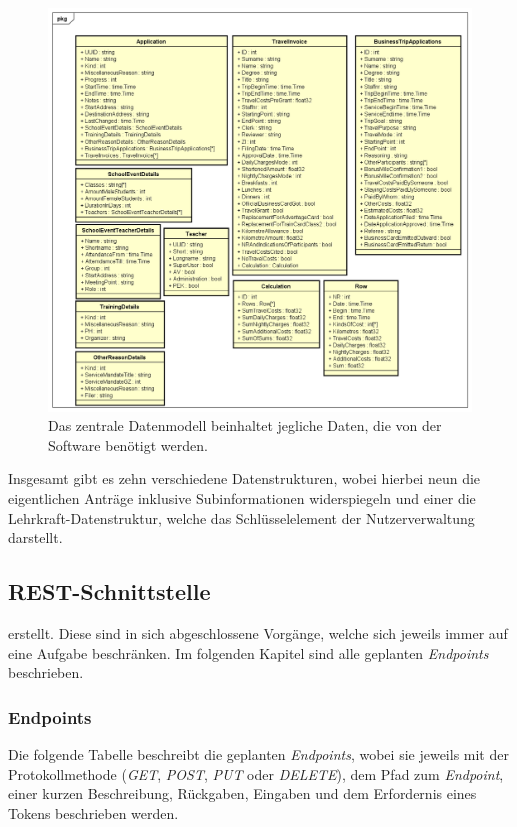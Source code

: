 \begin{figure}[H]
	\centering
	\includegraphics[width=\linewidth]{images/mbeier_konzept/Datamodel}
	\caption[Zentrales Datenmodell]{Das zentrale Datenmodell beinhaltet jegliche Daten, die von der Software benötigt werden.}
	\label{fig:datamodel}
\end{figure}

Insgesamt gibt es zehn verschiedene Datenstrukturen, wobei hierbei neun die eigentlichen Anträge inklusive Subinformationen widerspiegeln und einer die Lehrkraft-Datenstruktur, welche das Schlüsselelement der Nutzerverwaltung darstellt.

\newpage

\subsection{REST-Schnittstelle}

 erstellt. Diese sind in sich abgeschlossene Vorgänge, welche sich jeweils immer auf eine Aufgabe beschränken. Im folgenden Kapitel sind alle geplanten \textit{Endpoints} beschrieben.

\subsubsection{Endpoints}
\label{chapter:endpoints}

Die folgende Tabelle beschreibt die geplanten \textit{Endpoints}, wobei  sie jeweils mit der Protokollmethode (\textit{GET}, \textit{POST}, \textit{PUT} oder \textit{DELETE}), dem Pfad zum \textit{Endpoint}, einer kurzen Beschreibung, Rückgaben, Eingaben und dem Erfordernis eines Tokens beschrieben werden.

